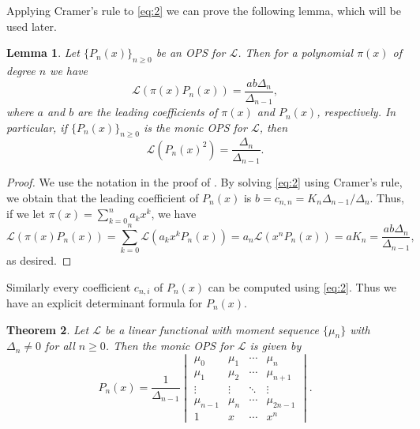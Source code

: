 \documentclass{amsart}
\numberwithin{equation}{section}
\newtheorem{thm}{Theorem}[section]
\newtheorem{lem}[thm]{Lemma}
\theoremstyle{definition}
\newcommand\LL{\mathcal{L}}
\begin{document}
Applying Cramer's rule to \eqref{eq:2} we can prove the following
lemma, which will be used later.

\begin{lem}\label{lem:L(pi*P)}
  Let \( \{ P_n(x) \}_{n\ge 0} \) be an OPS for \( \LL \).
  Then for a polynomial \( \pi(x) \) of degree \( n \) we have
 \[
  \LL(\pi(x)P_n(x)) = \frac{ab\Delta_n}{\Delta_{n-1}},
\] 
where \( a \) and \( b \) are the leading coefficients of \( \pi(x) \)
and \( P_n(x) \), respectively. In particular, if
\( \{ P_n(x) \}_{n\ge 0} \) is the monic OPS for \( \LL \), then
\[
  \LL(P_n(x)^2) = \frac{\Delta_n}{\Delta_{n-1}}.
\]
\end{lem}
\begin{proof}
  We use the notation in the proof of . By solving
  \eqref{eq:2} using Cramer's rule, we obtain that the leading
  coefficient of \( P_n(x) \) is
  \( b= c_{n,n} = K_n \Delta_{n-1}/\Delta_n \). Thus, if we let
  \( \pi(x) = \sum_{k=0}^n a_k x^k \), we have
\[
  \LL(\pi(x)P_n(x)) = \sum_{k=0}^n \LL(a_{k}x^kP_n(x))
  = a_{n}\LL(x^n P_n(x)) = a K_n = \frac{ab\Delta_n}{\Delta_{n-1}},
\]
as desired.
\end{proof}

Similarly every coefficient \( c_{n,i} \) of \( P_n(x) \) can be
computed using \eqref{eq:2}. Thus we have an explicit determinant
formula for \( P_n(x) \).

\begin{thm}\label{thm:P=Hankel}
  Let \( \LL \) be a linear functional with moment sequence
  \( \{\mu_n\} \) with \( \Delta_n\ne 0 \) for all \( n\ge0 \).
  Then the monic OPS for \( \LL \) is given by
  \[
    P_n(x) = \frac{1}{\Delta_{n-1}}
    \begin{vmatrix}
      \mu_0 & \mu_1 & \cdots & \mu_n\\
      \mu_1 & \mu_2 & \cdots & \mu_{n+1}\\
      \vdots & \vdots & \ddots & \vdots\\
      \mu_{n-1} & \mu_{n} & \cdots & \mu_{2n-1}\\
      1 & x & \cdots & x^n
    \end{vmatrix}.
  \]
\end{thm}
\end{document}
